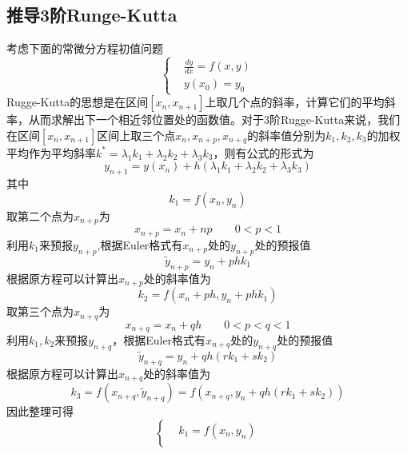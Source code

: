 \documentclass[twoside,twocolumn]{article}
\begin{document}
\begin{CJK*}{UTF8}{gkai}
\subsection{推导3阶Runge-Kutta}
考虑下面的常微分方程初值问题
\begin{equation*}
	\left\{
	\begin{aligned}
		&\frac{dy}{dx}=f(x,y)\\
		&y(x_{0})=y_{0}
	\end{aligned}
	\right.
\end{equation*}
Rugge-Kutta的思想是在区间$[x_{n},x_{n+1}]$上取几个点的斜率，计算它们的平均斜率，从而求解出下一个相近邻位置处的函数值。对于3阶Rugge-Kutta来说，我们在区间$[x_{n},x_{n+1}]$区间上取三个点$x_{n},x_{n+p},x_{n+q}$的斜率值分别为$k_{1},k_{2},k_{3}$的加权平均作为平均斜率$k^{*}=\lambda_{1}k_{1}+\lambda_{2}k_{2}+\lambda_{3}k_{3}$，则有公式的形式为
\begin{equation*}
	y_{n+1}=y(x_{n})+h(\lambda_{1}k_{1}+\lambda_{2}k_{2}+\lambda_{3}k_{3})
\end{equation*}
其中
\begin{equation*}
	k_{1}=f(x_{n},y_{n})
\end{equation*}
取第二个点为$x_{n+p}$为
\begin{equation*}
	x_{n+p}=x_{n}+np\qquad 0<p<1
\end{equation*}
利用$k_{1}$来预报$y_{n+p}$,根据Euler格式有$x_{n+p}$处的$y_{n+p}$处的预报值
\begin{equation*}
	\tilde{y}_{n+p}=y_{n}+phk_{1}
\end{equation*}
根据原方程可以计算出$x_{n+p}$处的斜率值为
\begin{equation*}
	k_{2}=f(x_{n}+ph,y_{n}+phk_{1})
\end{equation*}
取第三个点为$x_{n+q}$为
\begin{equation*}
	x_{n+q}=x_{n}+qh\qquad 0<p<q<1
\end{equation*}
利用$k_{1},k_{2}$来预报$y_{n+q}$，根据Euler格式有$x_{n+q}$处的$y_{n+q}$处的预报值
\begin{equation*}
	\tilde{y}_{n+q}=y_{n}+qh(rk_{1}+sk_{2})
\end{equation*}
根据原方程可以计算出$x_{n+q}$处的斜率值为
\begin{equation*}
	k_{3}=f(x_{n+q},\tilde{y}_{n+q})=f(x_{n+q},y_{n}+qh(rk_{1}+sk_{2}))
\end{equation*}
因此整理可得
\begin{equation*}
	\left\{
	\begin{aligned}
		&k_{1}=f(x_{n},y_{n})\\

\end{aligned}
\end{equation*}
\end{CJK*}
\end{document}
